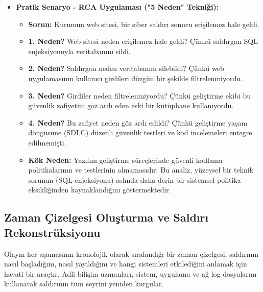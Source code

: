 \begin{itemize}
\begin{itemize}
\begin{itemize}
    \item \textbf{Pratik Senaryo - RCA Uygulaması ("5 Neden" Tekniği):}
    \begin{itemize}
        \item \textbf{Sorun:} Kurumun web sitesi, bir siber saldırı sonucu erişilemez hale geldi.
        \item \textbf{1. Neden?} Web sitesi neden erişilemez hale geldi? Çünkü saldırgan SQL enjeksiyonuyla veritabanını sildi.
        \item \textbf{2. Neden?} Saldırgan neden veritabanını silebildi? Çünkü web uygulamasının kullanıcı girdileri düzgün bir şekilde filtrelenmiyordu.
        \item \textbf{3. Neden?} Girdiler neden filtrelenmiyordu? Çünkü geliştirme ekibi bu güvenlik zafiyetini göz ardı eden eski bir kütüphane kullanıyordu.
        \item \textbf{4. Neden?} Bu zafiyet neden göz ardı edildi? Çünkü geliştirme yaşam döngüsüne (SDLC) düzenli güvenlik testleri ve kod incelemeleri entegre edilmemişti.
        \item \textbf{Kök Neden:} Yazılım geliştirme süreçlerinde güvenli kodlama politikalarının ve testlerinin olmamasıdır. Bu analiz, yüzeysel bir teknik sorunun (SQL enjeksiyonu) aslında daha derin bir sistemsel politika eksikliğinden kaynaklandığını göstermektedir.
    \end{itemize}
\end{itemize}

\subsection{Zaman Çizelgesi Oluşturma ve Saldırı Rekonstrüksiyonu}

Olayın her aşamasının kronolojik olarak sıralandığı bir zaman çizelgesi, saldırının nasıl başladığını, nasıl yayıldığını ve hangi sistemleri etkilediğini anlamak için hayati bir araçtır. Adli bilişim uzmanları, sistem, uygulama ve ağ log dosyalarını kullanarak saldırının tüm seyrini yeniden kurgular.


\end{itemize}
\end{itemize}
